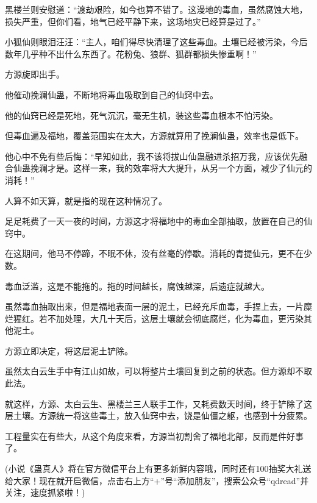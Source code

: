 \begin{this_body}
黑楼兰则安慰道：“渡劫艰险，如今也算不错了。这漫地的毒血，虽然腐蚀大地，损失严重，但你们看，地气已经平静下来，这场地灾已经算是过了。”

小狐仙则眼泪汪汪：“主人，咱们得尽快清理了这些毒血。土壤已经被污染，今后数年几乎种不出什么东西了。花粉兔、狼群、狐群都损失惨重啊！”

方源旋即出手。

他催动挽澜仙蛊，不断地将毒血吸取到自己的仙窍中去。

他的仙窍已经是死地，死气沉沉，毫无生机，装这些毒血根本不怕污染。

但毒血遍及福地，覆盖范围实在太大，方源就算用了挽澜仙蛊，效率也是低下。

他心中不免有些后悔：“早知如此，我不该将拔山仙蛊融进杀招万我，应该优先融合仙蛊挽澜才是。这样一来，我的效率将大大提升，从另一个方面，减少了仙元的消耗！”

人算不如天算，就是指的现在这种情况了。

足足耗费了一天一夜的时间，方源这才将福地中的毒血全部抽取，放置在自己的仙窍中。

在这期间，他马不停蹄，不眠不休，没有丝毫的停歇。消耗的青提仙元，更不在少数。

毒血泛滥，这是不能拖的。拖的时间越长，腐蚀越深，后遗症就越大。

虽然毒血抽取出来，但是福地表面一层的泥土，已经充斥血毒，手捏上去，一片糜烂猩红。若不加处理，大几十天后，这层土壤就会彻底腐烂，化为毒血，更污染其他泥土。

方源立即决定，将这层泥土铲除。

虽然太白云生手中有江山如故，可以将整片土壤回复到之前的状态。但方源却不取此法。

就这样，方源、太白云生、黑楼兰三人联手工作，又耗费数天时间，终于铲除了这层土壤。方源统一将这些毒土，放入仙窍中去，饶是仙僵之躯，也感到十分疲累。

工程量实在有些大，从这个角度来看，方源当初割舍了福地北部，反而是件好事了。

(小说《蛊真人》将在官方微信平台上有更多新鲜内容哦，同时还有100抽奖大礼送给大家！现在就开启微信，点击右上方“+”号“添加朋友”，搜索公众号“qdread”并关注，速度抓紧啦！)

\end{this_body}

